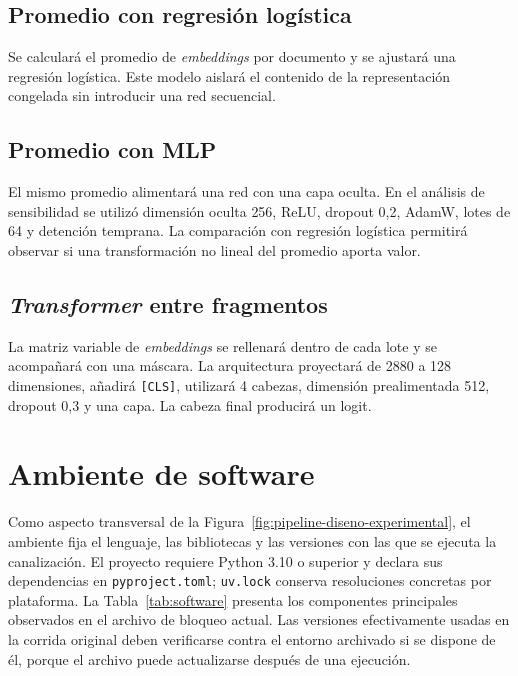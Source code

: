 \subsection{Promedio con regresión logística}

Se calculará el promedio de \textit{embeddings} por documento y se ajustará una regresión logística. Este modelo aislará el contenido de la representación congelada sin introducir una red secuencial.

\subsection{Promedio con MLP}

El mismo promedio alimentará una red con una capa oculta. En el análisis de sensibilidad se utilizó dimensión oculta 256, ReLU, dropout 0,2, AdamW, lotes de 64 y detención temprana. La comparación con regresión logística permitirá observar si una transformación no lineal del promedio aporta valor.

\subsection{\textit{Transformer} entre fragmentos}

La matriz variable de \textit{embeddings} se rellenará dentro de cada lote y se acompañará con una máscara. La arquitectura proyectará de 2880 a 128 dimensiones, añadirá \texttt{[CLS]}, utilizará 4 cabezas, dimensión prealimentada 512, dropout 0,3 y una capa. La cabeza final producirá un logit.

\section{Ambiente de software}
\label{sec:ambiente_software}

Como aspecto transversal de la Figura~\ref{fig:pipeline-diseno-experimental}, el ambiente fija el lenguaje, las bibliotecas y las versiones con las que se ejecuta la canalización. El proyecto requiere Python 3.10 o superior y declara sus dependencias en \texttt{pyproject.toml}; \texttt{uv.lock} conserva resoluciones concretas por plataforma. La Tabla~\ref{tab:software} presenta los componentes principales observados en el archivo de bloqueo actual. Las versiones efectivamente usadas en la corrida original deben verificarse contra el entorno archivado si se dispone de él, porque el archivo puede actualizarse después de una ejecución.

